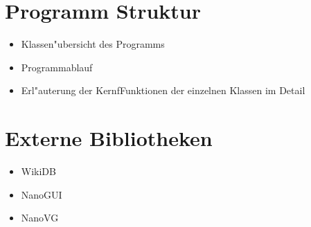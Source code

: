 


\section{Programm Struktur}
\begin{itemize}
    \item Klassen"ubersicht des Programms
    \item Programmablauf
    \item Erl"auterung der KernfFunktionen der einzelnen Klassen im Detail
\end{itemize}



\section{Externe Bibliotheken}
\begin{itemize}
    \item WikiDB
    \item NanoGUI
    \item NanoVG
\end{itemize}











